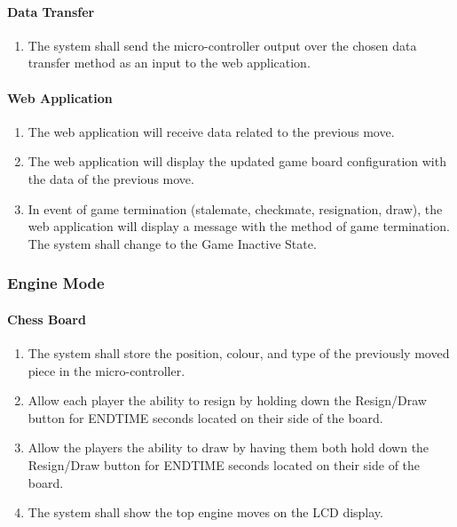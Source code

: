 \documentclass[12pt]{article}
\begin{document}
{\paragraph{Data Transfer}
\begin{enumerate}[{ND}1., leftmargin=2\parindent]
    \item The system shall send the micro-controller output over the chosen data transfer method as an input to the web application.
\end{enumerate}

\paragraph{Web Application}
\begin{enumerate}[{NA}1., leftmargin=2\parindent]
    \item The web application will receive data related to the previous move.
    \item The web application will display the updated game board configuration with the data of the previous move.
    \item In event of game termination (stalemate, checkmate, resignation, draw), the web application will display a message with the method of game termination. The system shall change to the Game Inactive State.
\end{enumerate}

\subsubsection{Engine Mode}
\paragraph{Chess Board}
\begin{enumerate}[{EB}1., leftmargin=2\parindent]
    \item The system shall store the position, colour, and type of the previously moved piece in the micro-controller.
    \item Allow each player the ability to resign by holding down the Resign/Draw button for ENDTIME seconds located on their side of the board.
    \item Allow the players the ability to draw by having them both hold down the Resign/Draw button for ENDTIME seconds located on their side of the board.
    \item The system shall show the top engine moves on the LCD display.
\end{enumerate}

}
\end{document}
